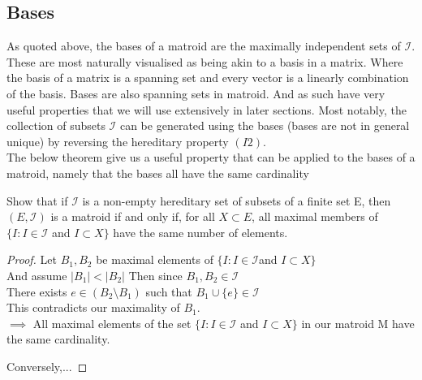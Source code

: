 \documentclass[../main.tex]{subfiles}
\begin{document}
 \subsection{Bases}
As quoted above, the bases of a matroid are the maximally independent sets of $\mathcal{I}.$  These are most naturally visualised as being akin to a basis in a matrix. Where the basis of a matrix is a spanning set and every vector is a linearly combination of the basis. Bases are also spanning sets in  matroid. And as such have very useful properties that we will use extensively in later sections. Most notably, the collection of subsets $\mathcal{I}$ can be generated using the bases (bases are not in general unique) by reversing the hereditary property $(I2).$ \\
The below theorem give us a useful property that can be applied to the bases of a matroid, namely that the bases all have the same cardinality
 \begin{thm}
 Show that if $\mathcal{I}$ is a non-empty hereditary set of subsets of a finite set E, then $(E,\mathcal{I})$ is a matroid if and only if, for all $X \subset E$, all maximal members of $\{I : I \in \mathcal{I} $ and $ I \subset X\}$ have the same number of elements.
 \end{thm}
\begin{proof}
 Let $B_1 , B_2$ be maximal elements of $\{I : I \in \mathcal{I} $and $ I \subset X\}$ \\
\noindent And assume $|B_1| < |B_2|$
Then since $B_1, B_2 \in \mathcal{I}$
\\
There exists $e \in (B_2 \setminus B_1)$ such that $B_1 \cup \{e\} \in \mathcal{I}$
\\
This contradicts our maximality of $B_1$.\\
 \noindent $\implies$ All maximal elements of the set $\{I : I \in \mathcal{I} $ and $ I \subset X\}$ in our matroid M have the same cardinality.

Conversely,...
\end{proof}
 
\end{document}
